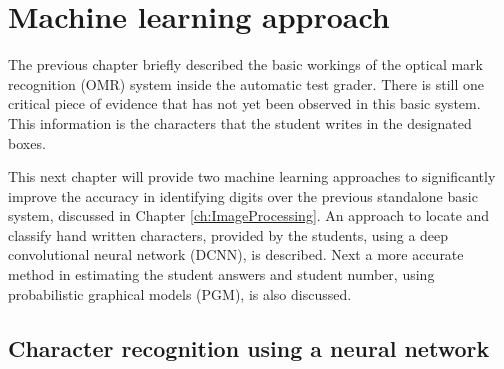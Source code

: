 \chapter{Machine learning approach}
\label{ch:MachineLearning}
\graphicspath{{Chapter4/Chapter4Figures/}}

The previous chapter briefly described the basic workings of the optical mark recognition (OMR) system inside the automatic test grader. There is still one critical piece of evidence that has not yet been observed in this basic system. This information is the characters that the student writes in the designated boxes.

This next chapter will provide two machine learning approaches to significantly improve the accuracy in identifying digits over the previous standalone basic system, discussed in Chapter \ref{ch:ImageProcessing}. An approach to locate and classify hand written characters, provided by the students, using a deep convolutional neural network (DCNN), is described. Next a more accurate method in estimating the  student answers and student number, using probabilistic  graphical models (PGM), is also discussed. 

\section{Character recognition using a neural network}

